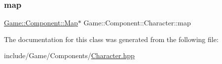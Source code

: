 \subsubsection{\texorpdfstring{map}{map}}
{\footnotesize\ttfamily \mbox{\hyperlink{class_game_1_1_component_1_1_map}{Game\+::\+Component\+::\+Map}}$\ast$ Game\+::\+Component\+::\+Character\+::map}



The documentation for this class was generated from the following file\+:\begin{DoxyCompactItemize}
\item 
include/\+Game/\+Components/\mbox{\hyperlink{_character_8hpp}{Character.\+hpp}}\end{DoxyCompactItemize}

